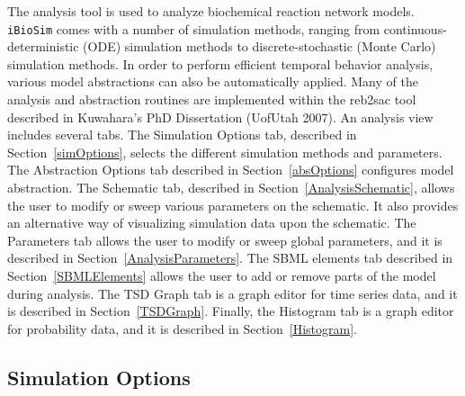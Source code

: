 \documentclass[titlepage,11pt]{article}
\begin{document}
\noindent
The analysis tool is used to analyze biochemical reaction network models.  {\tt iBioSim} comes with a number of simulation methods, ranging from continuous-deterministic (ODE) simulation methods to discrete-stochastic (Monte Carlo) simulation methods.  In order to perform efficient temporal behavior analysis, various model abstractions can also be automatically applied.  Many of the analysis and abstraction routines are implemented
within the reb2sac tool described in 
Kuwahara's PhD Dissertation (UofUtah 2007).
  An analysis view includes several tabs.  The Simulation Options tab, described in Section~\ref{simOptions}, selects the different simulation methods and parameters.  The Abstraction Options tab described in Section~\ref{absOptions} configures model abstraction.  The Schematic tab, described in Section~\ref{AnalysisSchematic}, allows the user to modify or sweep various parameters on the schematic.  It also provides an alternative way of visualizing simulation data upon the schematic.  The Parameters tab allows the user to modify or sweep global parameters, and it is described in Section~\ref{AnalysisParameters}.  The SBML elements tab described in Section~\ref{SBMLElements} allows the user to add or remove parts of the model during analysis.  The TSD Graph tab is a graph editor for time series data, and it is described in Section~\ref{TSDGraph}.  Finally, the Histogram tab is a graph editor for probability data, and it is described in Section~\ref{Histogram}.

\subsection{\label{simOptions}Simulation Options}
\end{document}
